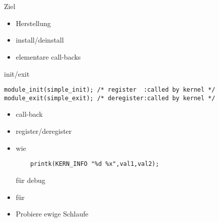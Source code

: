 \section{}

\begin{frame}{Ziel}{}
 \begin{itemize}
  \item Herstellung 
  \item install/deinstall
  \item elementare call-backs
 \end{itemize}
\end{frame}

\begin{frame}[fragile]{}{init/exit}
 \begin{lstlisting}
module_init(simple_init); /* register  :called by kernel */
module_exit(simple_exit); /* deregister:called by kernel */
 \end{lstlisting}
 \begin{itemize}
  \item call-back
  \item register/deregister
  \item {} wie 
  \begin{lstlisting}
    printk(KERN_INFO "%d %x",val1,val2);
  \end{lstlisting}
  für debug
  \item {} für  
  \item Probiere ewige Schlaufe 
 \end{itemize}
\end{frame}

